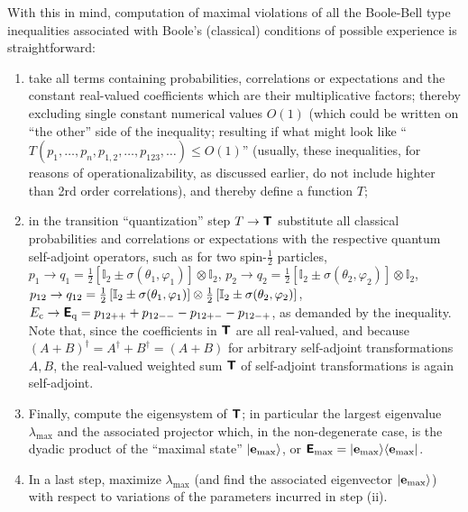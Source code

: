 With this in mind, computation of maximal violations of all the Boole-Bell type inequalities associated with
 Boole's  (classical) conditions of possible experience
is straightforward:
\begin{enumerate}

\item   take all terms containing probabilities, correlations or expectations
and the constant real-valued coefficients which are their
multiplicative factors;
thereby excluding single constant numerical values $O(1)$
(which could be written on ``the other'' side of the inequality; resulting if what might look like
``$T(p_1,\ldots,p_n, p_{1,2},\ldots,p_{123}, \ldots) \le O(1)$'' (usually, these inequalities,
for reasons of operationalizability, as discussed earlier, do not include highter than 2rd order correlations),
and thereby define a function $T$;
\item
in the transition ``quantization'' step $T \rightarrow \textsf{\textbf{T}}$
substitute all classical probabilities and correlations or expectations with the respective quantum
self-adjoint operators, such as for two spin-$\frac{1}{2}$ particles,
$p_1  \rightarrow  q_1
=
{\frac{1}{2}}\left[\mathbb{I}_2 \pm {\sigma}( \theta_1,\varphi_1)\right]\otimes  \mathbb{I}_2$,
$p_2  \rightarrow  q_2
=
{\frac{1}{2}}\left[\mathbb{I}_2 \pm {\sigma}( \theta_2,\varphi_2)\right]\otimes  \mathbb{I}_2$,
$p_{12} \rightarrow  q_{12}   =
{\frac{1}{2}}\left[\mathbb{I}_2 \pm {\bf \sigma}( \theta_1,\varphi_1)\right]
\otimes
{\frac{1}{2}}\left[\mathbb{I}_2 \pm {\bf \sigma}(  \theta_2,\varphi_2)\right]
$,
$
E_{\text{c}} \rightarrow
\textsf{\textbf{E}}_{\text{q}} =  p_{12++}+ p_{12--}  -p_{12+-} -p_{12-+}
$,
as demanded by the inequality.
Note that, since the coefficients in $\textsf{\textbf{T}}$ are all real-valued, and
because $(A+B)^\dagger =A^\dagger +B^\dagger = (A+B)$ for arbitrary self-adjoint transformations $A,B$,
the real-valued weighted sum $\textsf{\textbf{T}}$ of self-adjoint transformations is again self-adjoint.

\item
Finally, compute the eigensystem of $\textsf{\textbf{T}}$; in particular the
largest eigenvalue  $\lambda_{\text{max}}$ and the associated projector
which, in the non-degenerate case, is the dyadic product of the ``maximal state''
$\vert {\bf e}_{\text{max}} \rangle$, or
$\textsf{\textbf{E}}_{\text{max}} = \vert {\bf e}_{\text{max}} \rangle \langle  {\bf e}_{\text{max}} \vert $.

\item
In a last step, maximize $\lambda_{\text{max}}$
(and find the associated eigenvector $\vert {\bf e}_{\text{max}} \rangle$)
with respect to variations of the parameters incurred in step (ii).
\end{enumerate}

